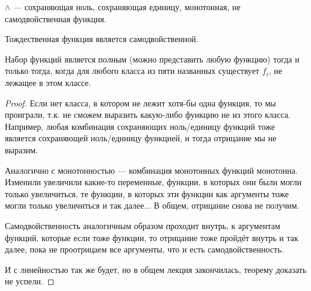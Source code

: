 \begin{example}
	$\land$ --- сохраняющая ноль, сохраняющая единицу, монотонная, не самодвойственная функция. 
	
	Тождественная функция является самодвойственной. 
\end{example}

\begin{theorem}
	Набор функций является полным (можно представить любую функцию) тогда и только тогда, когда для любого класса из пяти названных существует $f_i$, не лежащее в этом классе.
\end{theorem}
\begin{proof}
	Если нет класса, в котором не лежит хотя-бы одна функция, то мы проиграли, т.к. не сможем выразить какую-либо функцию не из этого класса. Например, любая комбинация сохраняющих ноль/единицу функций тоже является сохраняющей ноль/единицу функцией, и тогда отрицание мы не выразим.

	Аналогично с монотонностью --- комбинация монотонных функций монотонна. Изменили увеличили какие-то переменные, функции, в которых они были могли только увеличиться, те функции, в которых эти функции как аргументы тоже могли только увеличиться и так далее... В общем, отрицание снова не получим. 

	Самодвойственность аналогичным образом проходит внутрь, к аргументам функций, которые если тоже функции, то отрицание тоже пройдёт внутрь и так далее, пока не проотрицаем все аргументы, что и есть самодвойственность. 

	И с линейностью так же будет, но в общем лекция закончилась, теорему доказать не успели.
\end{proof}
